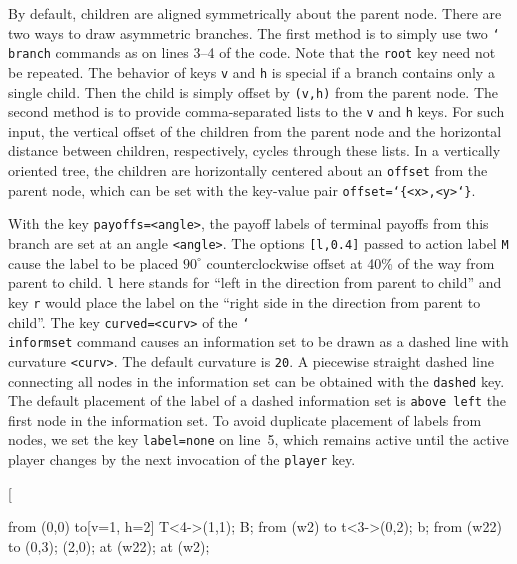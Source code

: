 \documentclass{article}
\makeatletter
\newcounter{fox}
\def\fox{\@ifstar\@fox\@@fox}
\def\@@fox{\@ifnextchar[{\fox@opt}{\fox@bgt}}
\renewcommand{\textbackslash}{\char`\\}
\def\cmd#1{\texttt{\color{cmd}\textbackslash#1}}
\def\leftbrace{\char`\{}
\def\rightbrace{\char`\}}
\def\arg#1{{\color{cmd}\leftbrace}{\color{black}#1}{\color{cmd}\rightbrace}}
\def\optarg[#1]{{\color{player1}[#1]}}
\def\largeskip{\vskip9pt plus 3pt minus 3pt}
\makeatother
\begin{document}
By default, children are aligned symmetrically about the parent node. There are two ways to draw asymmetric branches. The first method is to simply use two \cmd{branch} commands as on lines 3--4 of the code. Note that the \texttt{root} key need not be repeated. The behavior of keys \texttt{v} and \texttt{h} is special if a branch contains only a single child. Then the child is simply offset by \texttt{(v,h)} from the parent node. The second method is to provide comma-separated lists to the \texttt{v} and \texttt{h} keys. For such input, the vertical offset of the children from the parent node and the horizontal distance between children, respectively, cycles through these lists. In a vertically oriented tree, the children are horizontally centered about an \texttt{offset} from the parent node, which can be set with the key-value pair \texttt{offset=\arg{<x>,<y>}}.

With the key \texttt{payoffs=<angle>}, the payoff labels of terminal payoffs from this branch are set at an angle \texttt{<angle>}. The options \texttt{\optarg[l,0.4]} passed to action label \texttt{M} cause the label to be placed $90^{\circ}$ counterclockwise offset at 40\% of the way from parent to child. \texttt{l} here stands for ``left in the direction from parent to child'' and key \texttt{r} would place the label on the ``right side in the direction from parent to child''. The key \texttt{curved=<curv>} of the \cmd{informset} command causes an information set to be drawn as a dashed line with curvature \texttt{<curv>}. The default curvature is \texttt{20}. A piecewise straight dashed line connecting all nodes in the information set can be obtained with the \texttt{dashed} key. The default placement of the label of a dashed information set is \texttt{above left} the first node in the information set. To avoid duplicate placement of labels from nodes, we set the key \texttt{label=none} on line~5, which remains active until the active player changes by the next invocation of the \texttt{player} key.
\largeskip

\fox{
\begin{center}
\begin{gametree}[horizontal, terminal=p, subgame={depth=9.3mm}, alert width=2pt]
	\branch[player=1, root=w] from (0,0) to[v=1, h=2] {T<4->(1,1); B};
	\branch[player=2, label=225, contour=delay, very sticky] from (w2) to {t<3->(0,2); b};
	\branch[player=1] from (w22) to {\tau(0,3); \beta<2->(2,0)};
	 at (w22);
	 at (w2);
\end{gametree}\label{tree:horizontal}
\end{center}
}
\end{document}
